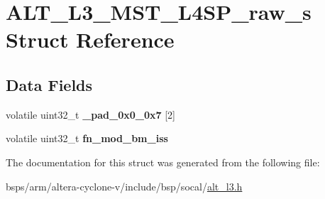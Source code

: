 \hypertarget{structALT__L3__MST__L4SP__raw__s}{}\section{A\+L\+T\+\_\+\+L3\+\_\+\+M\+S\+T\+\_\+\+L4\+S\+P\+\_\+raw\+\_\+s Struct Reference}
\label{structALT__L3__MST__L4SP__raw__s}
\subsection*{Data Fields}
\begin{DoxyCompactItemize}
\item 
\mbox{\label{structALT__L3__MST__L4SP__raw__s_a506775a0e68a152eff20c8ed29cd2019}} 
volatile uint32\+\_\+t {\bfseries \+\_\+pad\+\_\+0x0\+\_\+0x7} \mbox{[}2\mbox{]}
\item 
\mbox{\label{structALT__L3__MST__L4SP__raw__s_aa6bfde578e63fc636065c3c343f87d16}} 
volatile uint32\+\_\+t {\bfseries fn\+\_\+mod\+\_\+bm\+\_\+iss}
\end{DoxyCompactItemize}


The documentation for this struct was generated from the following file\+:\begin{DoxyCompactItemize}
\item 
bsps/arm/altera-\/cyclone-\/v/include/bsp/socal/\mbox{\hyperlink{alt__l3_8h}{alt\+\_\+l3.\+h}}\end{DoxyCompactItemize}
